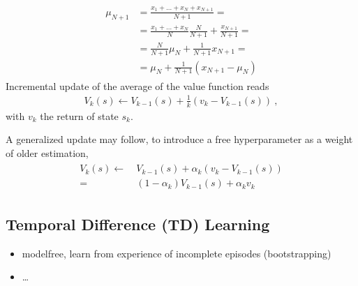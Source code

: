 \documentclass[letterpaper,10pt,english]{jupyterBook}
\begin{document}
\sphinxAtStartPar
{}
\begin{equation*}
\begin{split}\begin{aligned}
  \mu_{N+1} 
  & = \frac{x_1 + \dots + x_N + x_{N+1}}{N+1} = \\
  & = \frac{x_1 + \dots + x_N}{N} \frac{N}{N+1} + \frac{x_{N+1}}{N+1} = \\
  & = \frac{N}{N+1} \mu_{N} + \frac{1}{N+1} x_{N+1} = \\
  & = \mu_{N} + \frac{1}{N+1} \left( x_{N+1} - \mu_{N} \right)
\end{aligned}\end{split}
\end{equation*}
\sphinxAtStartPar
Incremental update of the average of the value function reads
\begin{equation*}
\begin{split}V_{k}(s) \leftarrow V_{k-1}(s) + \frac{1}{k} \left( v_k - V_{k-1}(s) \right) \ ,\end{split}
\end{equation*}
\sphinxAtStartPar
with \(v_k\) the return of state \(s_k\).

\sphinxAtStartPar
A generalized update may follow, to introduce a free hyperparameter as a weight of older estimation,
\begin{equation*}
\begin{split}\begin{aligned}
  V_{k}(s) 
  \leftarrow & \ V_{k-1}(s) + \alpha_k \left( v_k - V_{k-1}(s) \right) \\
           = & \ ( 1 - \alpha_k ) V_{k-1}(s) + \alpha_k v_k
\end{aligned}\end{split}
\end{equation*}

\subsection{Temporal Difference (TD) Learning}
\label{\detokenize{ch/rl/mdp_sol_rl:temporal-difference-td-learning}}\label{\detokenize{ch/rl/mdp_sol_rl:rl-mdp-sol-rl-eval-td}}\begin{itemize}
\item {} 
\sphinxAtStartPar
model\sphinxhyphen{}free, learn from experience of incomplete episodes (bootstrapping)

\item {} 
\sphinxAtStartPar
…

\end{itemize}
\end{document}
